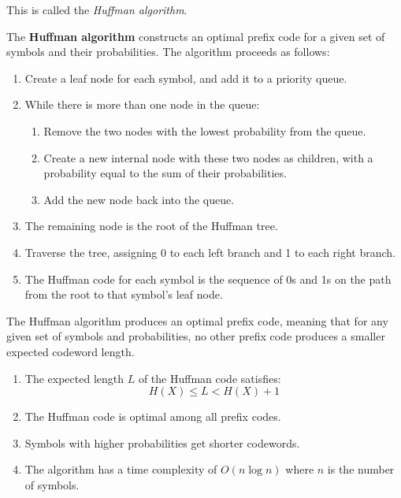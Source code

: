\documentclass{article}
\begin{document}
    This is called the \textit{Huffman algorithm}. 

    \begin{theorem}
      The \textbf{Huffman algorithm} constructs an optimal prefix code for a given set of symbols and their probabilities. The algorithm proceeds as follows:

      \begin{enumerate}
        \item Create a leaf node for each symbol, and add it to a priority queue.
        \item While there is more than one node in the queue:
        \begin{enumerate}
          \item Remove the two nodes with the lowest probability from the queue.
          \item Create a new internal node with these two nodes as children, with a probability equal to the sum of their probabilities.
          \item Add the new node back into the queue.
        \end{enumerate}
        \item The remaining node is the root of the Huffman tree.
        \item Traverse the tree, assigning 0 to each left branch and 1 to each right branch.
        \item The Huffman code for each symbol is the sequence of 0s and 1s on the path from the root to that symbol's leaf node.
      \end{enumerate}

      The Huffman algorithm produces an optimal prefix code, meaning that for any given set of symbols and probabilities, no other prefix code produces a smaller expected codeword length.
      \begin{enumerate}
        \item The expected length $L$ of the Huffman code satisfies:
        \begin{equation}
          H(X) \leq L < H(X) + 1
        \end{equation}
        \item The Huffman code is optimal among all prefix codes.
        \item Symbols with higher probabilities get shorter codewords.
        \item The algorithm has a time complexity of $O(n \log n)$ where $n$ is the number of symbols.
      \end{enumerate}
    \end{theorem}
\end{document}
